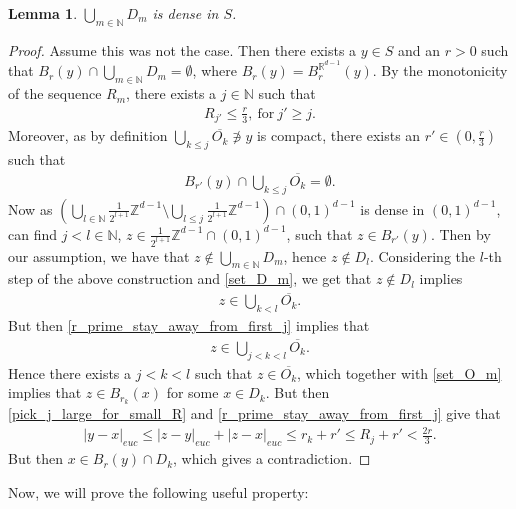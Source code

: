 \documentclass[a4paper,10pt]{article}
\newtheorem{lemma}[theorem]{Lemma}
\numberwithin{equation}{section}
\newcommand{\R}{\mathbb{R}}
\newcommand{\N}{\mathbb{N}}
\newcommand{\Z}{\mathbb{Z}}
\begin{document}
\begin{lemma}\label{D_m_dense}
$\bigcup_{m \in \N} D_m$ is dense in $S$.
\end{lemma}
\begin{proof}
     Assume this was not the case. Then there exists a $y \in S$ and an $r >0$ such that $B_r(y) \cap \bigcup_{m \in \N} D_m = \emptyset$, where $B_r(y)=B^{\R^{d-1}}_{r}(y)$. 
By the monotonicity of the sequence $R_m$, there exists a $j \in \N$ such that 
\begin{align}\label{pick_j_large_for_small_R}
    R_{j'} \leq \frac{r}{3}, \ \mathrm{for}\ j' \geq j.
\end{align}
Moreover, as by definition $\bigcup_{k \leq j} \overline{O_k} \not \ni y$ is compact, there exists an $r' \in (0, \frac{r}{3})$ such that 
\begin{align}\label{r_prime_stay_away_from_first_j}
    B_{r'}(y) \cap \bigcup_{k \leq j} \overline{O_k} = \emptyset.
\end{align}
Now as $(\bigcup_{l \in \N} \frac{1}{2^{l+1}} \Z^{d-1}\setminus \bigcup_{l \leq j} \frac{1}{2^{l+1}} \Z^{d-1})\cap (0,1)^{d-1}$ is dense in $(0,1)^{d-1}$, can find $j<l \in \N$, $z \in \frac{1}{2^{l+1}}\Z^{d-1} \cap (0,1)^{d-1}$, such that $z \in B_{r'}(y)$. 
Then by our assumption, we have that $z \notin \bigcup_{m \in \N} D_m$, hence $z \notin D_l$. 
Considering the $l$-th step of the above construction and \eqref{set_D_m}, we get that $z \notin D_l$ implies
\begin{align*}
    z \in \bigcup_{k < l} \overline{O_k}. 
\end{align*}
But then \eqref{r_prime_stay_away_from_first_j} implies that 
\begin{align*}
    z \in \bigcup_{j < k < l} \overline{O_k}. 
\end{align*}
Hence there exists a $j<k <l$ such that $z \in \overline{O_k}$, which together with \eqref{set_O_m} implies that $z \in B_{r_k}(x)$ for some $x \in D_k$. But then \eqref{pick_j_large_for_small_R} and \eqref{r_prime_stay_away_from_first_j} give that 
\begin{align*}
    |y-x|_{euc} \leq |z-y|_{euc} + |z-x|_{euc} \leq r_k+ r' \leq R_j + r' < \frac{2r}{3}.
\end{align*}
But then $x \in B_r(y) \cap D_k$, which gives a contradiction. 
\end{proof}

Now, we will prove the following useful property:
\smallskip
\end{document}
